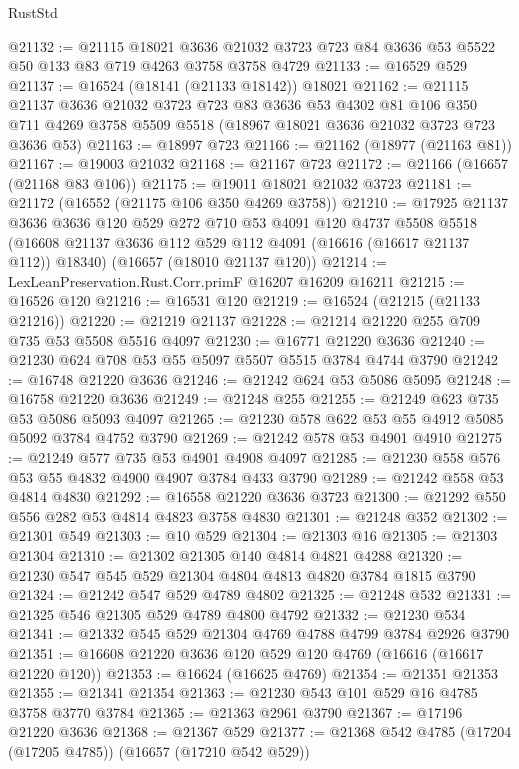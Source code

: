 \begin{lexlean}{RustStd}
\begin{coremodule}
@21132 := @21115
    @18021
    @3636
    @21032
    @3723
    @723
    @84
    @3636
    @53
    @5522
    @50
    @133
    @83
    @719
    @4263
    @3758
    @3758
    @4729
@21133 := @16529 @529
@21137 := @16524 (@18141 (@21133 @18142)) @18021
@21162 := @21115
    @21137
    @3636
    @21032
    @3723
    @723
    @83
    @3636
    @53
    @4302
    @81
    @106
    @350
    @711
    @4269
    @3758
    @5509
    @5518
    (@18967 @18021 @3636 @21032 @3723 @723 @3636 @53)
@21163 := @18997 @723
@21166 := @21162 (@18977 (@21163 @81))
@21167 := @19003 @21032
@21168 := @21167 @723
@21172 := @21166 (@16657 (@21168 @83 @106))
@21175 := @19011 @18021 @21032 @3723
@21181 := @21172 (@16552 (@21175 @106 @350 @4269 @3758))
@21210 := @17925
    @21137
    @3636
    @3636
    @120
    @529
    @272
    @710
    @53
    @4091
    @120
    @4737
    @5508
    @5518
    (@16608 @21137 @3636 @112 @529 @112 @4091 (@16616 (@16617 @21137 @112)) @18340)
    (@16657 (@18010 @21137 @120))
@21214 := LexLeanPreservation.Rust.Corr.primF @16207 @16209 @16211
@21215 := @16526 @120
@21216 := @16531 @120
@21219 := @16524 (@21215 (@21133 @21216))
@21220 := @21219 @21137
@21228 := @21214 @21220 @255 @709 @735 @53 @5508 @5516 @4097
@21230 := @16771 @21220 @3636
@21240 := @21230 @624 @708 @53 @55 @5097 @5507 @5515 @3784 @4744 @3790
@21242 := @16748 @21220 @3636
@21246 := @21242 @624 @53 @5086 @5095
@21248 := @16758 @21220 @3636
@21249 := @21248 @255
@21255 := @21249 @623 @735 @53 @5086 @5093 @4097
@21265 := @21230 @578 @622 @53 @55 @4912 @5085 @5092 @3784 @4752 @3790
@21269 := @21242 @578 @53 @4901 @4910
@21275 := @21249 @577 @735 @53 @4901 @4908 @4097
@21285 := @21230 @558 @576 @53 @55 @4832 @4900 @4907 @3784 @433 @3790
@21289 := @21242 @558 @53 @4814 @4830
@21292 := @16558 @21220 @3636 @3723
@21300 := @21292 @550 @556 @282 @53 @4814 @4823 @3758 @4830
@21301 := @21248 @352
@21302 := @21301 @549
@21303 := @10 @529
@21304 := @21303 @16
@21305 := @21303 @21304
@21310 := @21302 @21305 @140 @4814 @4821 @4288
@21320 := @21230 @547 @545 @529 @21304 @4804 @4813 @4820 @3784 @1815 @3790
@21324 := @21242 @547 @529 @4789 @4802
@21325 := @21248 @532
@21331 := @21325 @546 @21305 @529 @4789 @4800 @4792
@21332 := @21230 @534
@21341 := @21332 @545 @529 @21304 @4769 @4788 @4799 @3784 @2926 @3790
@21351 := @16608 @21220 @3636 @120 @529 @120 @4769 (@16616 (@16617 @21220 @120))
@21353 := @16624 (@16625 @4769)
@21354 := @21351 @21353
@21355 := @21341 @21354
@21363 := @21230 @543 @101 @529 @16 @4785 @3758 @3770 @3784
@21365 := @21363 @2961 @3790
@21367 := @17196 @21220 @3636
@21368 := @21367 @529
@21377 := @21368 @542 @4785 (@17204 (@17205 @4785)) (@16657 (@17210 @542 @529))

\end{coremodule}
\end{lexlean}
